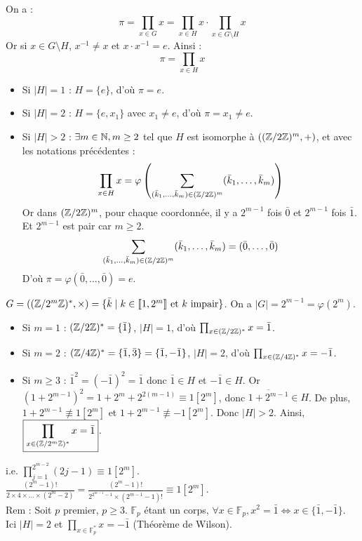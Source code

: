 \begin{solution}
On a :
\[ \pi = \prod_{x \in G} x = \prod_{x \in H} x \cdot \prod_{x \in G \setminus H} x \]
Or si $x \in G \setminus H$, $x^{-1} \neq x$ et $x \cdot x^{-1} = e$. Ainsi :
\[ \pi = \prod_{x \in H} x \]
\begin{itemize}
  \item Si $|H| = 1$ : $H = \{e\}$, d'où $\pi = e$.
  \item Si $|H| = 2$ : $H = \{e, x_1\}$ avec $x_1 \neq e$, d'où $\pi = x_1 \neq e$.
  \item Si $|H| > 2$ : $\exists m \in \mathbb N, m \geq 2$ tel que $H$ est isomorphe à $((\mathbb Z/2\mathbb Z)^m, +)$, et avec les notations précédentes :
  \[ \prod_{x \in H} x = \varphi\left( \sum_{(\bar{k}_1, \dots, \bar{k}_m) \in (\mathbb Z/2\mathbb Z)^m} (\bar{k}_1, \dots, \bar{k}_m) \right) \]
  Or dans $(\mathbb Z/2\mathbb Z)^m$, pour chaque coordonnée, il y a $2^{m-1}$ fois $\bar{0}$ et $2^{m-1}$ fois $\bar{1}$. Et $2^{m-1}$ est pair car $m \geq 2$.
  \[ \sum_{(\bar{k}_1, \dots, \bar{k}_m) \in (\mathbb Z/2\mathbb Z)^m} (\bar{k}_1, \dots, \bar{k}_m) = (\bar{0}, \dots, \bar{0}) \]
  D'où $\pi = \varphi(\bar{0}, \dots, \bar{0}) = e$.
\end{itemize}

$G = \left((\mathbb Z/2^m\mathbb Z)^*, \times\right) = \{\bar{k} \mid k \in \llbracket 1, 2^m \rrbracket \text{ et } k \text{ impair}\}$. On a $|G| = 2^{m-1} = \varphi(2^m)$.
\begin{itemize}
  \item Si $m = 1$ : $(\mathbb Z/2\mathbb Z)^* = \{\bar{1}\}$, $|H| = 1$, d'où $\prod_{x \in (\mathbb Z/2\mathbb Z)^*} x = \bar{1}$.
  \item Si $m = 2$ : $(\mathbb Z/4\mathbb Z)^* = \{\bar{1}, \bar{3}\} = \{\bar{1}, -\bar{1}\}$, $|H| = 2$, d'où $\prod_{x \in (\mathbb Z/4\mathbb Z)^*} x = -\bar{1}$.
  \item Si $m \geq 3$ : $\bar{1}^2 = (-\bar{1})^2 = \bar{1}$ donc $\bar{1} \in H$ et $-\bar{1} \in H$.
  Or $(1+2^{m-1})^2 = 1 + 2^m + 2^{2(m-1)} \equiv 1 [2^m]$, donc $\overline{1+2^{m-1}} \in H$.
  De plus, $1+2^{m-1} \not\equiv 1 [2^m]$ et $1+2^{m-1} \not\equiv -1 [2^m]$.
  Donc $|H| > 2$.
  Ainsi, $\boxed{\prod_{x \in (\mathbb Z/2^m\mathbb Z)^*} x = \bar{1}}$.
\end{itemize}

\begin{remarkbox}
i.e. $\prod_{j=1}^{2^{m-2}} (2j-1) \equiv 1 [2^m]$. \\
$\frac{(2^m-1)!}{2 \times 4 \times \dots \times (2^m-2)} = \frac{(2^m-1)!}{2^{2^{m-1}-1} \times (2^{m-1}-1)!} \equiv 1 [2^m]$. \\
Rem : Soit $p$ premier, $p \geq 3$. $\mathbb{F}_p$ étant un corps, $\forall x \in \mathbb{F}_p, x^2 = \bar{1} \iff x \in \{\bar{1}, -\bar{1}\}$. Ici $|H| = 2$ et $\prod_{x \in \mathbb{F}_p^*} x = -\bar{1}$ (Théorème de Wilson).
\end{remarkbox}
\end{solution}

